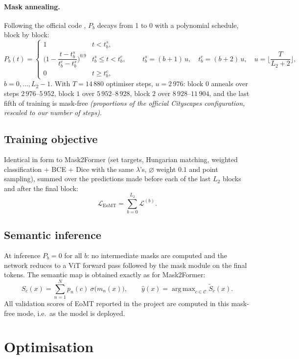 \documentclass[11pt,a4paper]{article}
\newcommand{\1}{\mathbb{1}}
\newcommand{\sg}{\sigma}
\newcommand{\nulc}{\varnothing}
\DeclareMathOperator*{\argmax}{arg\,max}
\begin{document}
\paragraph{Mask annealing.} Following the official code \cite{kerssies2025vitsecretlyimagesegmentation},
$P_b$ decays from 1 to 0 with a polynomial schedule, block by block:
\[
P_b(t) =
\begin{cases}
1 & t < t^{s}_b,\\[2pt]
\Big(1 - \dfrac{t - t^{s}_b}{t^{e}_b - t^{s}_b}\Big)^{0.9} & t^{s}_b \le t < t^{e}_b,\\[8pt]
0 & t \ge t^{e}_b,
\end{cases}
\qquad
t^{s}_b = (b+1)\,u,\quad t^{e}_b = (b+2)\,u,\quad u = \Big\lfloor\frac{T}{L_2+2}\Big\rfloor,
\]
$b = 0,\dots,L_2-1$. With $T=14\,880$ optimiser steps, $u = 2\,976$: block
$0$ anneals over steps $2\,976$--$5\,952$, block $1$ over $5\,952$--$8\,928$,
block $2$ over $8\,928$--$11\,904$, and the last fifth of training is
mask-free \emph{(proportions of the official Cityscapes configuration,
rescaled to our number of steps)}.

\subsection{Training objective}

Identical in form to Mask2Former (set targets, Hungarian matching, weighted
classification + BCE + Dice with the same $\lambda$'s, $\nulc$ weight $0.1$
and point sampling), summed over the predictions made before each of the
last $L_2$ blocks and after the final block:
\[
\mathcal{L}_{\text{EoMT}} = \sum_{b=0}^{L_2}\mathcal{L}^{(b)} .
\]

\subsection{Semantic inference}

At inference $P_b = 0$ for all $b$: no intermediate masks are computed and the
network reduces to a ViT forward pass followed by the mask module on the final
tokens. The semantic map is obtained exactly as for Mask2Former:
\[
S_c(x) = \sum_{n=1}^{N} p_n(c)\ \sg\big(m_n(x)\big),
\qquad
\hat y(x) = \argmax_{c\in\mathcal{C}} \tilde S_c(x).
\]
All validation scores of EoMT reported in the project are computed in this
mask-free mode, i.e.\ as the model is deployed.

\section{Optimisation}\label{sec:optim}
\end{document}
